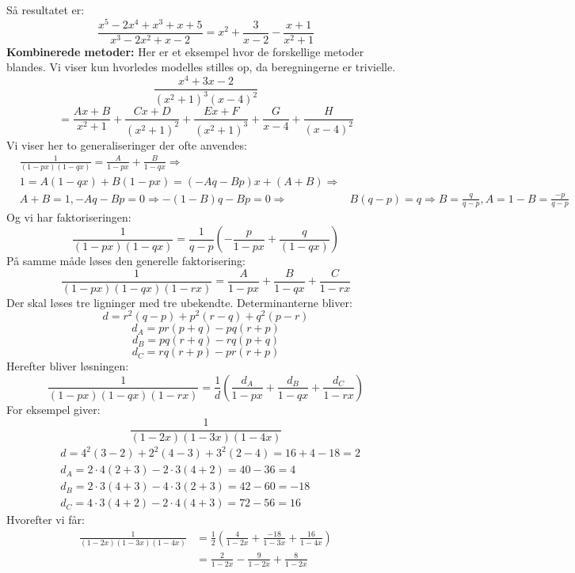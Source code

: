 Så resultatet er:
\[\frac{x^{5}-2x^{4}+x^{3}+x+5}{x^{3}-2x^{2}+x-2}=x^{2}+\frac{3}{x-2}-\frac{x+1}{x^{2}+1}\]
{\bf Kombinerede metoder:} Her er et eksempel hvor de forskellige metoder blandes. Vi viser kun hvorledes modelles stilles op, da beregningerne er trivielle.
\[\frac{x^{4}+3x-2}{(x^{2}+1)^{3}(x-4)^{2}}\]
\[=\frac{Ax+B}{x^{2}+1}+\frac{Cx+D}{(x^{2}+1)^{2}}+\frac{Ex+F}{(x^{2}+1)^{3}}+\frac{G}{x-4}+\frac{H}{(x-4)^{2}}\]
Vi viser her to generaliseringer der ofte anvendes:
\begin{align*}
&\frac{1}{(1-px)(1-qx)}=\frac{A}{1-px}+\frac{B}{1-qx} \Rightarrow\\
&1=A(1-qx)+B(1-px)=(-Aq-Bp)x+(A+B) \Rightarrow\\
&A+B=1, -Aq-Bp=0 \Rightarrow -(1-B)q-Bp=0 \Rightarrow\
&B(q-p)=q \Rightarrow B= \frac{q}{q-p}, A=1-B=\frac{-p}{q-p}
\end{align*}
Og vi har faktoriseringen:
\[\frac{1}{(1-px)(1-qx)}=\frac{1}{q-p}(-\frac{p}{1-px}+\frac{q}{(1-qx)})\]
På samme måde løses den generelle faktorisering:
\[\frac{1}{(1-px)(1-qx)(1-rx)}=\frac{A}{1-px}+\frac{B}{1-qx}+\frac{C}{1-rx}\]
Der skal løses tre ligninger med tre ubekendte. Determinanterne bliver:
\[d=r^{2}(q-p)+p^{2}(r-q)+q^{2}(p-r)\]
\[d_{A}=pr(p+q)-pq(r+p)\]
\[d_{B}=pq(r+q)-rq(p+q)\]
\[d_{C}=rq(r+p)-pr(r+p)\]
Herefter bliver løsningen:
\[\frac{1}{(1-px)(1-qx)(1-rx)}=\frac{1}{d}(\frac{d_{A}}{1-px}+\frac{d_{B}}{1-qx}+\frac{d_{C}}{1-rx})\]
For eksempel giver:
\[\frac{1}{(1-2x)(1-3x)(1-4x)}\]
\begin{align*}
&d=4^{2}(3-2)+2^{2}(4-3)+3^{2}(2-4)=16+4-18=2\\
&d_ {A}=2 \cdot 4(2+3)-2 \cdot 3(4+2)=40-36=4\\
&d_ {B}=2 \cdot 3(4+3)-4 \cdot 3(2+3)=42-60=-18\\
&d_ {C}=4 \cdot 3(4+2)-2 \cdot 4(4+3)=72-56=16
\end{align*}
Hvorefter vi får:
\begin{align*}
\frac{1}{(1-2x)(1-3x)(1-4x)}&=\frac{1}{2}(\frac{4}{1-2x}+\frac{-18}{1-3x}+\frac{16}{1-4x})\\
&=\frac{2}{1-2x}-\frac{9}{1-2x}+\frac{8}{1-2x}
\end{align*}
